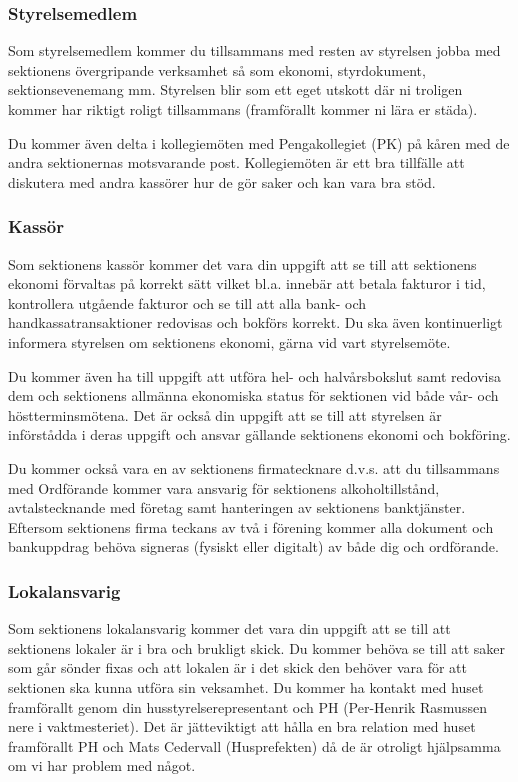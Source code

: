 \documentclass[10pt]{article}
\begin{document}
\subsubsection{Styrelsemedlem}
Som styrelsemedlem kommer du tillsammans med resten av styrelsen jobba med sektionens övergripande verksamhet så som ekonomi, styrdokument, sektionsevenemang mm. Styrelsen blir som ett eget utskott där ni troligen kommer har riktigt roligt tillsammans (framförallt kommer ni lära er städa).

Du kommer även delta i kollegiemöten med Pengakollegiet (PK) på kåren med de andra sektionernas motsvarande post. Kollegiemöten är ett bra tillfälle att diskutera med andra kassörer hur de gör saker och kan vara bra stöd.

\subsubsection{Kassör}
Som sektionens kassör kommer det vara din uppgift att se till att sektionens ekonomi förvaltas på korrekt sätt vilket bl.a. innebär att betala fakturor i tid, kontrollera utgående fakturor och se till att alla bank- och handkassatransaktioner redovisas och bokförs korrekt. Du ska även kontinuerligt informera styrelsen om sektionens ekonomi, gärna vid vart styrelsemöte.

Du kommer även ha till uppgift att utföra hel- och halvårsbokslut samt redovisa dem och sektionens allmänna ekonomiska status för sektionen vid både vår- och höstterminsmötena. Det är också din uppgift att se till att styrelsen är införstådda i deras uppgift och ansvar gällande sektionens ekonomi och bokföring.

Du kommer också vara en av sektionens firmatecknare d.v.s. att du tillsammans med Ordförande kommer vara ansvarig för sektionens alkoholtillstånd, avtalstecknande med företag samt hanteringen av sektionens banktjänster. Eftersom sektionens firma teckans av två i förening kommer alla dokument och bankuppdrag behöva signeras (fysiskt eller digitalt) av både dig och ordförande.

\subsubsection{Lokalansvarig}
Som sektionens lokalansvarig kommer det vara din uppgift att se till att sektionens lokaler är i bra och brukligt skick. Du kommer behöva se till att saker som går sönder fixas och att lokalen är i det skick den behöver vara för att sektionen ska kunna utföra sin veksamhet. Du kommer ha kontakt med huset framförallt genom din husstyrelserepresentant och PH (Per-Henrik Rasmussen nere i vaktmesteriet). Det är jätteviktigt att hålla en bra relation med huset framförallt PH och Mats Cedervall (Husprefekten) då de är otroligt hjälpsamma om vi har problem med något.
\end{document}
